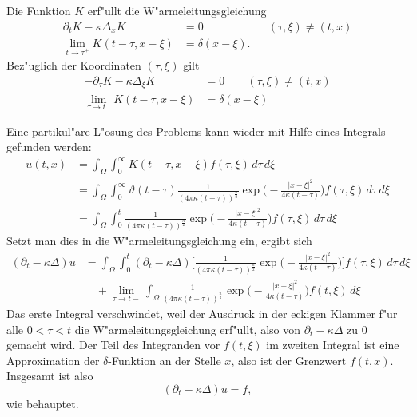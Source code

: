 \begin{satz}
Die Funktion $K$ erf"ullt die W"armeleitungsgleichung
\begin{align*}
\partial_tK-\kappa\Delta_xK&=0&&(\tau, \xi)\ne(t,x)
\\
\lim_{t\to\tau^+}K(t-\tau, x-\xi)&=\delta(x-\xi).
\end{align*}
Bez"uglich der Koordinaten $(\tau,\xi)$ gilt
\begin{align*}
-\partial_{\tau} K-\kappa\Delta_{\xi}K&=0\qquad(\tau,\xi)\ne(t,x)
\\
\lim_{\tau\to t^-}K(t-\tau, x-\xi)&=\delta(x-\xi)
\end{align*}
\end{satz}

Eine partikul"are L"osung des Problems kann wieder mit Hilfe eines Integrals
gefunden werden:
\begin{align*}
u(t,x)
&=
\int_\Omega\int_0^\infty
K(t-\tau,x-\xi)f(\tau,\xi)
\,d\tau\,d\xi
\\
&=
\int_\Omega\int_0^\infty
\vartheta(t-\tau)\frac1{(4\pi\kappa(t-\tau))^{\frac{n}2}}
\exp\biggl(-\frac{|x-\xi|^2}{4\kappa(t-\tau)}\biggr)
f(\tau,\xi)
\,d\tau\,d\xi
\\
&=
\int_\Omega\int_0^t
\frac1{(4\pi\kappa(t-\tau))^{\frac{n}2}}
\exp\biggl(-\frac{|x-\xi|^2}{4\kappa(t-\tau)}\biggr)
f(\tau,\xi)
\,d\tau\,d\xi
\end{align*}
Setzt man dies in die W"armeleitungsgleichung ein, ergibt sich
\begin{align*}
(\partial_t-\kappa\Delta)u
&=
\int_\Omega\int_0^t
(\partial_t-\kappa\Delta)\biggl[
\frac1{(4\pi\kappa(t-\tau))^{\frac{n}2}}
\exp\biggl(-\frac{|x-\xi|^2}{4\kappa(t-\tau)}\biggr)\biggr]
f(\tau,\xi)
\,d\tau\,d\xi
\\
&\quad+
\lim_{\tau\to t-}
\int_\Omega
\frac1{(4\pi\kappa(t-\tau))^{\frac{n}2}}
\exp\biggl(-\frac{|x-\xi|^2}{4\kappa(t-\tau)}\biggr)
f(t,\xi)
\,d\xi
\end{align*}
Das erste Integral verschwindet, weil der Ausdruck in der eckigen Klammer
f"ur alle $0<\tau<t$ die W"armeleitungsgleichung erf"ullt, also von
$\partial_t-\kappa\Delta$ zu $0$ gemacht wird.
Der Teil des Integranden vor $f(t,\xi)$ im zweiten Integral ist eine
Approximation der $\delta$-Funktion an der Stelle $x$, also ist der Grenzwert
$f(t,x)$. Insgesamt ist also
\[
(\partial_t-\kappa\Delta)u=f,
\]
wie behauptet.

